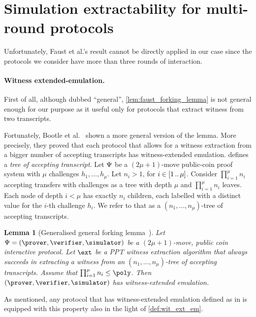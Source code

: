 \documentclass[runningheads,11pt]{llncs}
\newtheorem{lemma}[theorem]{Lemma}
\theoremstyle{definition}
\begin{document}


%
\section{Simulation extractability for multi-round protocols}
Unfortunately, Faust et al.'s result cannot be directly applied in our case since the protocols we consider have more than three rounds of interaction.

\paragraph{Witness extended-emulation.}
First of all, although dubbed ``general'', \cref{lem:faust_forking_lemma} is not general enough for our purpose as it useful only for protocols that extract witness from two transcripts.

Fortunately, Bootle et al.~\cite{EC:BCCGP16} shown a more general version of the lemma. More precisely, they proved that each protocol that allows for a witness extraction from a bigger number of accepting transcripts has witness-extended emulation. \cite{EC:BCCGP16} defines a \emph{tree of accepting transcript}.
Let $\mathrm{\Psi}$ be a $(2 \mu + 1)$-move public-coin proof system with $\mu$ challenges $h_1, \ldots, h_\mu$. Let $n_i > 1$, for $i \in [1 \, .. \, \mu]$.
Consider $\prod_{i = 1}^{\mu} n_i$ accepting transfers with challenges as a tree with depth $\mu$ and $\prod_{i = 1}^{\mu} n_i$ leaves.	Each node of depth $i < \mu$ has exactly $n_i$ children, each labelled with a distinct value for the $i$-th challenge $h_i$. We refer to that as a $(n_1, \ldots, n_\mu)$-tree of accepting transcripts.

\begin{lemma}[Generalised general forking lemma~\cite{EC:BCCGP16}]
	\label{lem:bootle_forking_lemma}
	Let $\proofsystem = (\prover, \verifier, \simulator)$ be a $(2\mu + 1)$-move, public coin interactive  protocol. Let $\ext$ be a PPT witness extraction algorithm that always succeeds in extracting a witness from an $(n_1, \ldots, n_\mu)$-tree of accepting transcripts. Assume that $\prod_{i = 1}^{\mu} n_i \leq \poly$.
	Then $(\prover, \verifier, \simulator)$ has witness-extended emulation.
\end{lemma}
As mentioned, any protocol that has witness-extended emulation defined as in \cite{EC:BCCGP16} is equipped with this property also in the light of \cref{def:wit_ext_em}.
\end{document}
